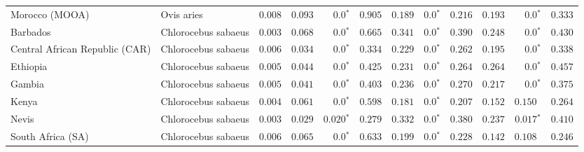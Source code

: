 \documentclass[9pt,twocolumn,twoside,lineno]{pnas-new}
\begin{document}
\begin{table*}[tb]
\begin{adjustbox}{width=17.8cm}
\begin{tabular}{||l|l|r||r|r|r||r|r|r||r|r|r||}
              Morocco (MOOA)                                      & Ovis aries          & $ 0.008$ & $ 0.093$ & $\bm{0.0{^*}}$    & $ 0.905$ & $ 0.189$ & $\bm{0.0{^*}}$ & $ 0.216$ & $ 0.193$ & $\bm{0.0{^*}}$ & $ 0.333$ \\
              \rowcolor{LIGHTGREY} Barbados                       & Chlorocebus sabaeus & $ 0.003$ & $ 0.068$ & $\bm{0.0{^*}}$                  & $ 0.665$                                                                     & $ 0.341$                      & $\bm{0.0{^*}}$ & $ 0.390$ & $ 0.248$ & $\bm{0.0{^*}}$ & $ 0.430$ \\
              \rowcolor{LIGHTGREY} Central African Republic (CAR) & Chlorocebus sabaeus & $ 0.006$           & $ 0.034$                      & $\bm{0.0{^*}}$ & $ 0.334$ & $ 0.229$ & $\bm{0.0{^*}}$ & $ 0.262$ & $ 0.195$ & $\bm{0.0{^*}}$ & $ 0.338$ \\
              \rowcolor{LIGHTGREY} Ethiopia                       & Chlorocebus sabaeus & $ 0.005$ & $ 0.044$ & $\bm{0.0{^*}}$                  & $ 0.425$                                                                     & $ 0.231$                      & $\bm{0.0{^*}}$ & $ 0.264$ & $ 0.264$ & $\bm{0.0{^*}}$ & $ 0.457$ \\
              \rowcolor{LIGHTGREY} Gambia                         & Chlorocebus sabaeus & $ 0.005$ & $ 0.041$ & $\bm{0.0{^*}}$                  & $ 0.403$                                                                     & $ 0.236$                      & $\bm{0.0{^*}}$ & $ 0.270$ & $ 0.217$ & $\bm{0.0{^*}}$ & $ 0.375$ \\
              \rowcolor{LIGHTGREY} Kenya                          & Chlorocebus sabaeus & $ 0.004$ & $ 0.061$ & $\bm{0.0{^*}}$    & $ 0.598$                                                                     & $ 0.181$                      & $\bm{0.0{^*}}$ & $ 0.207$ & $ 0.152$ & $ 0.150~~$ & $ 0.264$ \\
              \rowcolor{LIGHTGREY} Nevis                          & Chlorocebus sabaeus & $ 0.003$ & $ 0.029$ & $\bm{ 0.020{^*}}$               & $ 0.279$                                                                     & $ 0.332$                      & $\bm{0.0{^*}}$ & $ 0.380$ & $ 0.237$ & $\bm{ 0.017{^*}}$ & $ 0.410$ \\
              \rowcolor{LIGHTGREY} South Africa (SA)              & Chlorocebus sabaeus & $ 0.006$ & $ 0.065$ & $\bm{0.0{^*}}$                  & $ 0.633$                                                                     & $ 0.199$ & $\bm{0.0{^*}}$ & $ 0.228$ & $ 0.142$ & $ 0.108~~$ & $ 0.246$ \\

\end{tabular}
\end{adjustbox}
\end{table*}
\end{document}
